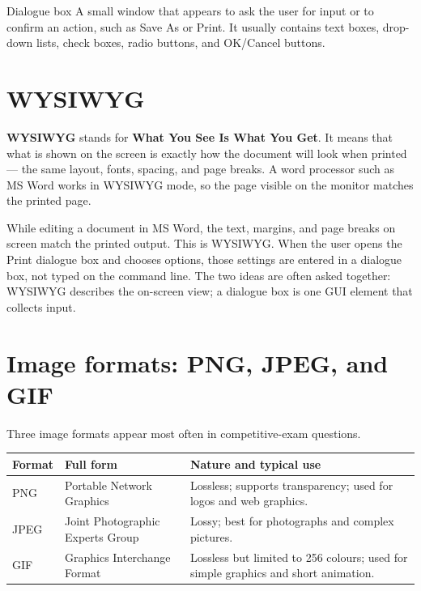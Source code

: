 \begin{definitionbox}{Dialogue box}
A small window that appears to ask the user for input or to confirm an action,
such as Save As or Print. It usually contains text boxes, drop-down lists,
check boxes, radio buttons, and OK/Cancel buttons.
\end{definitionbox}

\section{WYSIWYG}
\textbf{WYSIWYG} stands for \textbf{What You See Is What You Get}. It means
that what is shown on the screen is exactly how the document will look when
printed --- the same layout, fonts, spacing, and page breaks. A word processor
such as MS Word works in WYSIWYG mode, so the page visible on the monitor
matches the printed page.

\begin{example}
While editing a document in MS Word, the text, margins, and page breaks on
screen match the printed output. This is WYSIWYG. When the user opens the
Print dialogue box and chooses options, those settings are entered in a
dialogue box, not typed on the command line. The two ideas are often asked
together: WYSIWYG describes the on-screen view; a dialogue box is one GUI
element that collects input.
\end{example}

\section{Image formats: PNG, JPEG, and GIF}
Three image formats appear most often in competitive-exam questions.

\begin{center}
\begin{tabular}{p{}p{}p{}}
\toprule
\textbf{Format} & \textbf{Full form} & \textbf{Nature and typical use} \\
\midrule
PNG & Portable Network Graphics & Lossless; supports transparency; used for logos and web graphics. \\
JPEG & Joint Photographic Experts Group & Lossy; best for photographs and complex pictures. \\
GIF & Graphics Interchange Format & Lossless but limited to 256 colours; used for simple graphics and short animation. \\
\bottomrule
\end{tabular}
\end{center}

